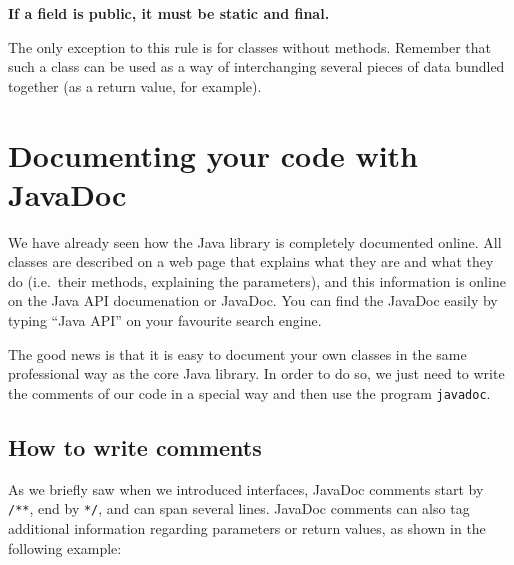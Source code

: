 \begin{center}
{\large \textbf{If a field is public, it must be static and final.}}  
\end{center}

The only exception to this rule is for classes without
methods. Remember that such a class can be used as a way of
interchanging several pieces of data bundled together (as a return
value, for example). 


\section{Documenting your code with JavaDoc}
\label{sec:docum-your-code}


We have already seen how the Java library is completely documented
online. All classes are described on a web page that explains
what they are and what they do (i.e.~their
methods, explaining the parameters), and this information is online on
the Java API documenation or JavaDoc. You can find the JavaDoc easily
by typing ``Java API'' on your favourite search engine. 

The good news is that it is easy to document your own classes in the
same professional way as the core Java library. In order to do so, we
just need to write the comments of our code in a special way and then
use the program \verb+javadoc+. 

\subsection{How to write comments}
\label{sec:writing-comments}

As we briefly saw when we introduced interfaces, JavaDoc comments
start by \verb+/**+, end by \verb+*/+, and can span several
lines. JavaDoc comments can also tag additional information regarding
parameters or return values, as shown in the following example: 

